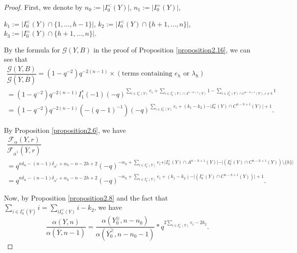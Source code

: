 \documentclass[11pt,oneside]{amsart}
\theoremstyle{plain}
\theoremstyle{definition}
\theoremstyle{remark}
\newcommand{\tx}[1]{\text{#1}}
\newcommand{\CF}{{\mathcal F}}
\newcommand{\CG}{{\mathcal G}}
\numberwithin{equation}{section}
\begin{document}
	\begin{proof}
		First, we denote by $n_0:=\vert I_0^<(Y) \vert$, $n_1:=\vert I_0^=(Y) \vert$, 
		
		$k_1:=\vert I_0^<(Y) \cap \lbrace 1, \dots,h-1 \rbrace \vert$, $k_2:=\vert I_0^<(Y) \cap \lbrace h+1, \dots,n \rbrace \vert$, $k_3:=\vert I_0^=(Y) \cap \lbrace h+1, \dots,n \rbrace \vert$.
		
		By the formula for $\CG(Y,B)$ in the proof of Proposition \ref{proposition2.16}, we can see that
		\begin{equation}\label{eq2.10}
			\begin{array}{l}
				\dfrac{\CG(Y,B)}{\CG(\overline{Y},\overline{B})}=(1-q^{-2})q^{-2(n-1)}\times (\tx{terms containing } e_h \tx{ or } \lambda_h)\\
				=(1-q^{-2})q^{-2(n-1)}I_1^*(-1)(-q)^{\sum_{i\in I_0^<(Y)}e_i+\sum_{i \in I_0^{<}(Y) \cap A^{n-h+1}(Y)}1-\sum_{i \in I_0^{\leq}(Y) \cap C^{n-h+1}(Y),  i \neq h}1}\\
				=(1-q^{-2})q^{-2(n-1)}(-(q-1)^{-1})(-q)^{\sum_{i\in I_0^<(Y)}e_i+(k_1-k_2)-\vert I_0^=(Y) \cap C^{n-h+1}(Y)\vert+1}.
			\end{array}
		\end{equation}
		
		By Proposition \ref{proposition2.6}, we have
		\begin{equation}\label{eq2.11}
			\begin{array}{l}
				\dfrac{\CF_{\alpha}(Y,r)}{\CF_{\overline{\alpha}^1}(\overline{Y},r)}\\
				=q^{n\delta_{\alpha}-(n-1)\delta_{\overline{\alpha}^1}+\alpha_h-n-2h+2}
				(-q)^{-\alpha_h+\sum_{i\in I_0^<(Y)}e_i+\vert I_0^{<}(Y) \cap A^{n-h+1}(Y)\vert-
					\vert (I_0^{\leq}(Y) \cap C^{n-h+1}(Y)) \setminus \lbrace h \rbrace\vert} \\
				=q^{n\delta_{\alpha}-(n-1)\delta_{\overline{\alpha}^1}+\alpha_h-n-2h+2}
				(-q)^{-\alpha_h+\sum_{i\in I_0^<(Y)}e_i+(k_1-k_2)-
					\vert (I_0^{=}(Y) \cap C^{n-h+1}(Y))\vert+1} .
			\end{array}
		\end{equation}
		
		Now, by Proposition \ref{proposition2.8} and the fact that $\sum_{i \in I_0^<(\overline{Y})} i=\sum_{i I_0^{<}(Y)}i-k_2$, we have
		\begin{equation}\label{eq2.12}
			\dfrac{\alpha(Y,n)}{\alpha(\overline{Y},n-1)}=\dfrac{\alpha(Y_0^{\geq},n-n_0)}{\alpha(\overline{Y}_0^{\geq},n-n_0-1)}*q^{2\sum_{i\in I_0^{<}(Y)}e_i-2k_2}.
		\end{equation}
		

\end{proof}
\end{document}
